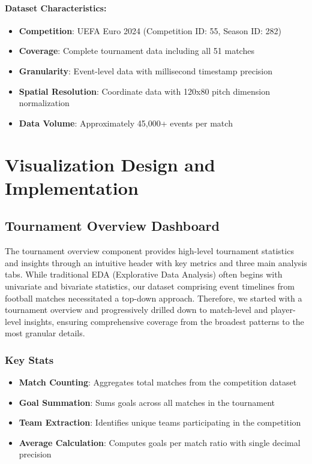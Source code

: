 \documentclass[12pt,a4paper]{article}
\begin{document}
\paragraph{Dataset Characteristics:}
\begin{itemize}
    \item \textbf{Competition}: UEFA Euro 2024 (Competition ID: 55, Season ID: 282)
    \item \textbf{Coverage}: Complete tournament data including all 51 matches
    \item \textbf{Granularity}: Event-level data with millisecond timestamp precision
    \item \textbf{Spatial Resolution}: Coordinate data with 120x80 pitch dimension normalization
    \item \textbf{Data Volume}: Approximately 45,000+ events per match
\end{itemize}

\section{Visualization Design and Implementation}
\label{sec:visualization_design}

\subsection{Tournament Overview Dashboard}

The tournament overview component provides high-level tournament statistics and insights through an intuitive header with key metrics and three main analysis tabs. While traditional EDA (Explorative Data Analysis) often begins with univariate and bivariate statistics, our dataset comprising event timelines from football matches necessitated a top-down approach. Therefore, we started with a tournament overview and progressively drilled down to match-level and player-level insights, ensuring comprehensive coverage from the broadest patterns to the most granular details.


\subsubsection{Key Stats}
\begin{itemize}
    \item \textbf{Match Counting}: Aggregates total matches from the competition dataset
    \item \textbf{Goal Summation}: Sums goals across all matches in the tournament
    \item \textbf{Team Extraction}: Identifies unique teams participating in the competition
    \item \textbf{Average Calculation}: Computes goals per match ratio with single decimal precision
\end{itemize}
\end{document}
